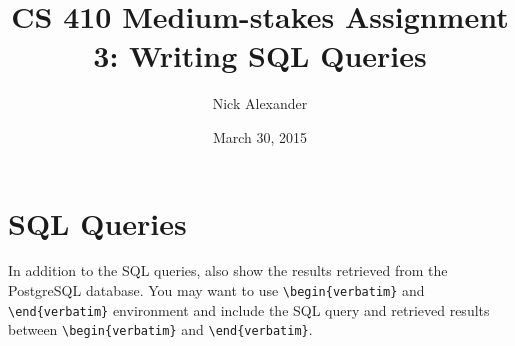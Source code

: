 \documentclass[11pt]{article}
\title{CS 410 Medium-stakes Assignment 3: Writing SQL Queries}
\author{Nick Alexander}
\date{March 30, 2015}
\begin{document}
\maketitle
\vspace*{-0.25in}
\thispagestyle{empty}
\tableofcontents
\newpage


\section{SQL Queries} \label{sec:queries}

In addition to the SQL queries, also show the results retrieved from the PostgreSQL database. You may want to use \verb+\begin{verbatim}+ and \verb+\end{verbatim}+ environment and include the SQL query and retrieved results between \verb+\begin{verbatim}+ and \verb+\end{verbatim}+.
\end{document}

